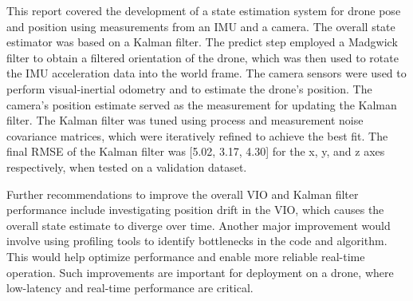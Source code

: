 \documentclass[bare_jrnl_transmag]{subfiles}
\begin{document}
This report covered the development of a state estimation system for drone pose and position using measurements from an IMU and a camera. The overall state estimator was based on a Kalman filter. The predict step employed a Madgwick filter to obtain a filtered orientation of the drone, which was then used to rotate the IMU acceleration data into the world frame. The camera sensors were used to perform visual-inertial odometry and to estimate the drone's position. The camera's position estimate served as the measurement for updating the Kalman filter. The Kalman filter was tuned using process and measurement noise covariance matrices, which were iteratively refined to achieve the best fit. The final RMSE of the Kalman filter was [5.02, 3.17, 4.30] for the x, y, and z axes respectively, when tested on a validation dataset.

Further recommendations to improve the overall VIO and Kalman filter performance include investigating position drift in the VIO, which causes the overall state estimate to diverge over time. Another major improvement would involve using profiling tools to identify bottlenecks in the code and algorithm. This would help optimize performance and enable more reliable real-time operation. Such improvements are important for deployment on a drone, where low-latency and real-time performance are critical.
\end{document}
